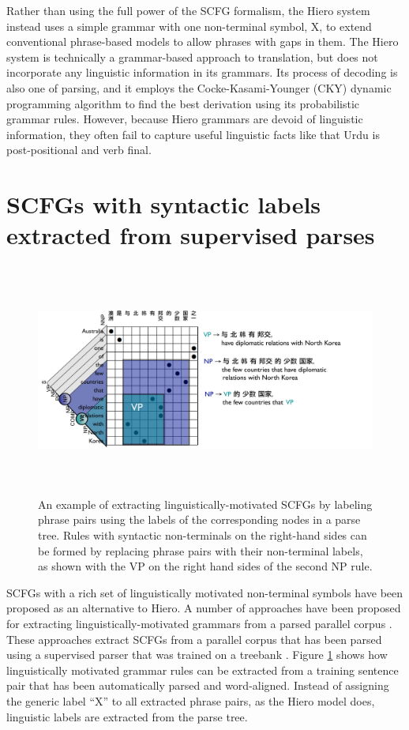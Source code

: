 Rather than using the full power of the SCFG formalism, the Hiero system instead uses a simple grammar with one non-terminal symbol, X, to extend conventional phrase-based models to allow phrases with gaps in them.  The Hiero system is technically a grammar-based approach to translation, but does not incorporate any linguistic information in its grammars.  Its process of decoding is also one of parsing, and it employs the Cocke-Kasami-Younger (CKY) dynamic programming algorithm to find the best derivation using its probabilistic grammar rules.   However, because Hiero grammars are devoid of linguistic information, they often fail to capture useful linguistic facts like that Urdu is post-positional and verb final. 

\section{SCFGs with syntactic labels extracted from supervised parses}\label{sec:samt}


\begin{figure}
\begin{center}
\includegraphics[height=3in]{SCFGs/scfg-phrase-extraction.pdf}
\end{center}
\caption{An example of extracting linguistically-motivated SCFGs by labeling phrase pairs using the labels of the corresponding nodes in a parse tree.  Rules with syntactic non-terminals on the right-hand sides can be formed by replacing  phrase pairs with their non-terminal labels, as shown with the VP on the right hand sides of the second NP rule.}\label{scfg-phrase-extraction}
\end{figure}


SCFGs with a rich set of linguistically motivated non-terminal symbols have been proposed as an alternative to Hiero. A number of approaches have been proposed for extracting linguistically-motivated grammars from a parsed parallel corpus \cite{Galley2004,samt}.   These approaches extract SCFGs from a parallel corpus that has been parsed using a supervised parser that was trained on a treebank \cite{Marcus1993,Collins1996,Charniak1997}.  
%
Figure \ref{scfg-phrase-extraction} shows how linguistically motivated grammar rules can be extracted from a training sentence pair that has been automatically parsed and word-aligned.    Instead of assigning the generic label ``X'' to all extracted phrase pairs, as the Hiero model does, linguistic labels are extracted from the parse tree.   

